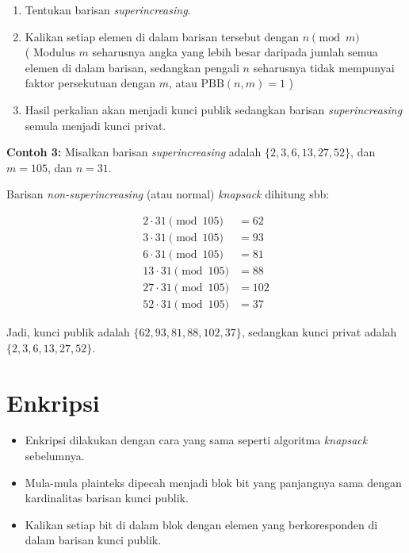 \documentclass{article}
\begin{document}
\begin{enumerate}
    \item Tentukan barisan \textit{superincreasing}.
    \item Kalikan setiap elemen di dalam barisan tersebut dengan $n \pmod{m}$ \\ ( Modulus $m$ seharusnya angka yang lebih besar daripada jumlah semua elemen di dalam barisan, sedangkan pengali $n$ seharusnya tidak mempunyai faktor persekutuan dengan $m$, atau $\text{PBB}(n, m) = 1$ )
    \item Hasil perkalian akan menjadi kunci publik sedangkan barisan \textit{superincreasing} semula menjadi kunci privat.
\end{enumerate}

\newpage


\textbf{Contoh 3:} Misalkan barisan \textit{superincreasing} adalah $\{2, 3, 6, 13, 27, 52\}$, dan $m = 105$, dan $n = 31$.

Barisan \textit{non-superincreasing} (atau normal) \textit{knapsack} dihitung sbb:

\begin{align*}
2 \cdot 31 \pmod{105} &= 62 \\
3 \cdot 31 \pmod{105} &= 93 \\
6 \cdot 31 \pmod{105} &= 81 \\
13 \cdot 31 \pmod{105} &= 88 \\
27 \cdot 31 \pmod{105} &= 102 \\
52 \cdot 31 \pmod{105} &= 37
\end{align*}

Jadi, kunci publik adalah $\{62, 93, 81, 88, 102, 37\}$, sedangkan kunci privat adalah $\{2, 3, 6, 13, 27, 52\}$.

\newpage


\section*{Enkripsi}

\begin{itemize}
    \item Enkripsi dilakukan dengan cara yang sama seperti algoritma \textit{knapsack} sebelumnya.
    \item Mula-mula plainteks dipecah menjadi blok bit yang panjangnya sama dengan kardinalitas barisan kunci publik.
    \item Kalikan setiap bit di dalam blok dengan elemen yang berkoresponden di dalam barisan kunci publik.
\end{itemize}
\end{document}
